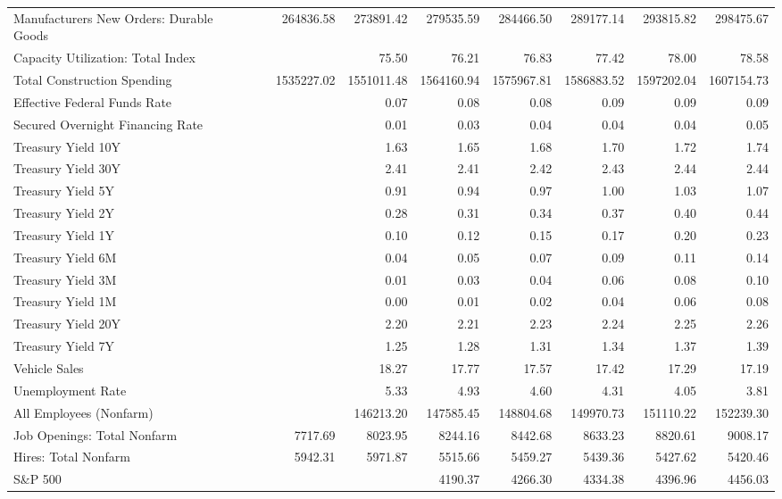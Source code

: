 \documentclass[11pt, letterpaper]{article}\usepackage[]{graphicx}\usepackage[]{color}
\begin{document}
\begin{table}[H]
\begin{tabular}{lrrrrrrrr}
  Manufacturers New Orders: Durable Goods &  & 264836.58 & 273891.42 & 279535.59 & 284466.50 & 289177.14 & 293815.82 & 298475.67 \\ 
  Capacity Utilization: Total Index &  &  & 75.50 & 76.21 & 76.83 & 77.42 & 78.00 & 78.58 \\ 
  Total Construction Spending &  & 1535227.02 & 1551011.48 & 1564160.94 & 1575967.81 & 1586883.52 & 1597202.04 & 1607154.73 \\ 
  Effective Federal Funds Rate &  &  & 0.07 & 0.08 & 0.08 & 0.09 & 0.09 & 0.09 \\ 
  Secured Overnight Financing Rate &  &  & 0.01 & 0.03 & 0.04 & 0.04 & 0.04 & 0.05 \\ 
  Treasury Yield 10Y &  &  & 1.63 & 1.65 & 1.68 & 1.70 & 1.72 & 1.74 \\ 
  Treasury Yield 30Y &  &  & 2.41 & 2.41 & 2.42 & 2.43 & 2.44 & 2.44 \\ 
  Treasury Yield 5Y &  &  & 0.91 & 0.94 & 0.97 & 1.00 & 1.03 & 1.07 \\ 
  Treasury Yield 2Y &  &  & 0.28 & 0.31 & 0.34 & 0.37 & 0.40 & 0.44 \\ 
  Treasury Yield 1Y &  &  & 0.10 & 0.12 & 0.15 & 0.17 & 0.20 & 0.23 \\ 
  Treasury Yield 6M &  &  & 0.04 & 0.05 & 0.07 & 0.09 & 0.11 & 0.14 \\ 
  Treasury Yield 3M &  &  & 0.01 & 0.03 & 0.04 & 0.06 & 0.08 & 0.10 \\ 
  Treasury Yield 1M &  &  & 0.00 & 0.01 & 0.02 & 0.04 & 0.06 & 0.08 \\ 
  Treasury Yield 20Y &  &  & 2.20 & 2.21 & 2.23 & 2.24 & 2.25 & 2.26 \\ 
  Treasury Yield 7Y &  &  & 1.25 & 1.28 & 1.31 & 1.34 & 1.37 & 1.39 \\ 
  Vehicle Sales &  &  & 18.27 & 17.77 & 17.57 & 17.42 & 17.29 & 17.19 \\ 
  Unemployment Rate &  &  & 5.33 & 4.93 & 4.60 & 4.31 & 4.05 & 3.81 \\ 
  All Employees (Nonfarm) &  &  & 146213.20 & 147585.45 & 148804.68 & 149970.73 & 151110.22 & 152239.30 \\ 
  Job Openings: Total Nonfarm &  & 7717.69 & 8023.95 & 8244.16 & 8442.68 & 8633.23 & 8820.61 & 9008.17 \\ 
  Hires: Total Nonfarm &  & 5942.31 & 5971.87 & 5515.66 & 5459.27 & 5439.36 & 5427.62 & 5420.46 \\ 
  S\&P 500 &  &  &  & 4190.37 & 4266.30 & 4334.38 & 4396.96 & 4456.03 \\ 

\end{tabular}
\end{table}
\end{document}
